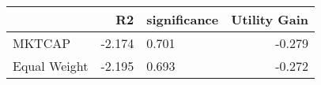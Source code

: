 \begin{tabular}{lrlr}
\toprule
{} &     R2 & significance &  Utility Gain \\
\midrule
MKTCAP       & -2.174 &       0.701  &        -0.279 \\
Equal Weight & -2.195 &       0.693  &        -0.272 \\
\bottomrule
\end{tabular}
